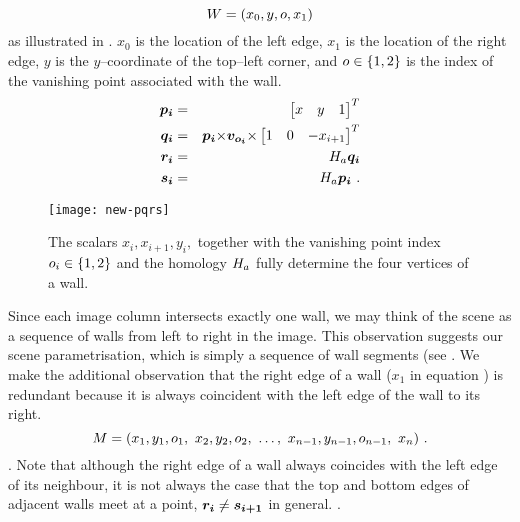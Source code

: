 \begin{equation}
  \label{eq:wall-def}
  \Wall = ( x_0, y, \WallOrient, x_1 )
\end{equation}
as illustrated in . $x_0$ is the location of the left
edge, $x_1$ is the location of the right edge, $y$ is the
$y$--coordinate of the top--left corner, and $\WallOrient\in\{1,2\}$
is the index of the vanishing point associated with the wall. 
\begin{eqnarray}
  \label{eq:pi}
  \vect{p_i} &=& \begin{bmatrix}x&y&1\end{bmatrix}^T \\
  \label{eq:qi}
  \vect{q_i} &=& \vect{p_i}\cross\vect{v_{\WallOrient_i}}\cross
               \begin{bmatrix}1&0&-x_{i+1}\end{bmatrix}^T\\
  \label{eq:ri}
  \vect{r_i} &=& \Hcf \vect{q_i}\\
  \label{eq:si}
  \vect{s_i} &=& \Hcf \vect{p_i} ~.
\end{eqnarray}

\begin{figure}[tb]%
  \centering
  \quad
  \texttt{[image: new-pqrs]}
  \caption{The scalars $x_i,x_{i+1},y_i,$ together with the
    vanishing point index $\WallOrient_i\in\{1,2\}$ and the homology $\Hcf$
    fully determine the four vertices of a wall.}
  \label{fig:pqrs}
\end{figure}

Since each image column intersects exactly one wall, we may think of
the scene as a sequence of walls from left to right in the image. This
observation suggests our scene parametrisation, which is simply a
sequence of wall segments (see . We make
the additional observation that the right edge of a wall ($x_1$ in
equation ) is redundant because it is always
coincident with the left edge of the wall to its right. 
\begin{equation}
  \Scene =
  ( x_1,y_1,\WallOrient_1,
  ~x_2,y_2,\WallOrient_2,
  ~\ldots,
  ~x_{n-1},y_{n-1},\WallOrient_{n-1},
  ~x_n ) ~.
  \label{eq:vertex-repr}
\end{equation}
. Note that although
the right edge of a wall always coincides with the left edge of its
neighbour, it is not always the case that the top and bottom edges of
adjacent walls meet at a point, \ie $\vect{r_i} \neq \vect{s_{i+1}}$
in general. .

